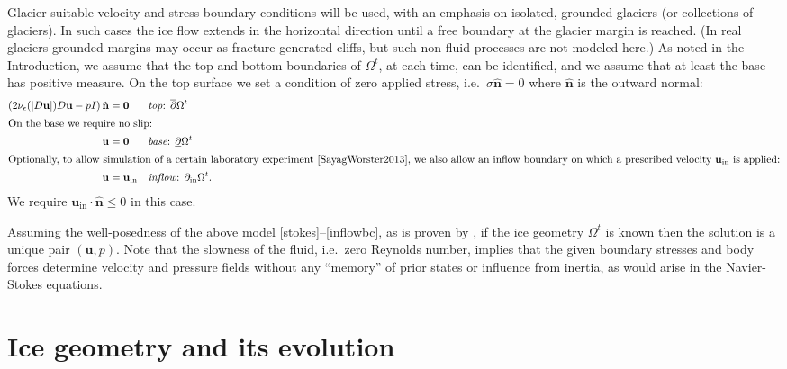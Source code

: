 \documentclass[letterpaper,final,12pt,reqno]{amsart}
\newcommand{\eps}{\epsilon}
\newcommand{\hbn}{\hat{\mathbf{n}}}
\newcommand{\bu}{\mathbf{u}}
\newcommand{\bzero}{\bm{0}}
\begin{document}
Glacier-suitable velocity and stress boundary conditions will be used, with an emphasis on isolated, grounded glaciers (or collections of glaciers).  In such cases the ice flow extends in the horizontal direction until a free boundary at the glacier margin is reached.  (In real glaciers grounded margins may occur as fracture-generated cliffs, but such non-fluid processes are not modeled here.)  As noted in the Introduction, we assume that the top and bottom boundaries of $\Omega^t$, at each time, can be identified, and we assume that at least the base has positive measure.  On the top surface we set a condition of zero applied stress, i.e.~$\sigma\hbn=0$ where $\hbn$ is the outward normal:
\begin{align}
\left(2 \nu_\eps(|D\bu|) D\bu - pI\right) \hbn &= \bzero  &&\text{\emph{top}: } \overline{\partial} \Omega^t \label{topbc} \\
\intertext{On the base we require no slip:}
\bu &= \bzero  &&\text{\emph{base}: } \underline{\partial} \Omega^t \label{basebc} \\
\intertext{Optionally, to allow simulation of a certain laboratory experiment \cite{SayagWorster2013}, we also allow an inflow boundary on which a prescribed velocity $\bu_{\text{in}}$ is applied:}
\bu &= \bu_{\text{in}}  &&\text{\emph{inflow}: } \partial_{\text{in}} \Omega^t. \label{inflowbc}
\end{align}
We require $\bu_{\text{in}}\cdot \hbn \le 0$ in this case.

Assuming the well-posedness of the above model \eqref{stokes}--\eqref{inflowbc}, as is proven by \cite{JouvetRappaz2011}, if the ice geometry $\Omega^t$ is known then the solution is a unique pair $(\bu,p)$.  Note that the slowness of the fluid, i.e.~zero Reynolds number, implies that the given boundary stresses and body forces determine velocity and pressure fields without any ``memory'' of prior states or influence from inertia, as would arise in the Navier-Stokes equations.


\section{Ice geometry and its evolution} \label{sec:stronggeometry}
\end{document}
